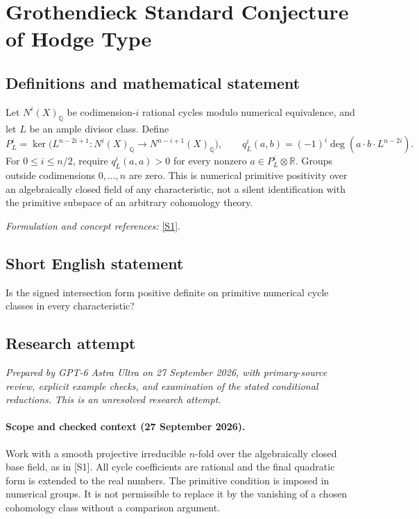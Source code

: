 \documentclass[11pt]{article}
\begin{document}
\section*{\texorpdfstring{Grothendieck Standard Conjecture of Hodge Type}{Grothendieck Standard Conjecture of Hodge Type}}\label{88}
\subsection{Definitions and mathematical statement}
Let $N^i(X)_{{\mathbb{Q}}}$ be codimension-$i$ rational cycles modulo numerical equivalence, and let $L$ be an ample divisor class. Define
\[
 P_L^i=\ker\bigl(L^{n-2i+1}:N^i(X)_{{\mathbb{Q}}}\to N^{n-i+1}(X)_{{\mathbb{Q}}}\bigr),
 \qquad q_L^i(a,b)=(-1)^i\deg(a\cdot b\cdot L^{n-2i}).
\]
For $0\le i\le n/2$, require $q_L^i(a,a)>0$ for every nonzero $a\in P_L^i\otimes{\mathbb{R}}$. Groups outside codimensions $0,\ldots,n$ are zero. This is numerical primitive positivity over an algebraically closed field of any characteristic, not a silent identification with the primitive subspace of an arbitrary cohomology theory.
\par\smallskip\textit{Formulation and concept references:} \href{https://ems.press/content/serial-article-files/53071}{[S1]}.

\subsection{Short English statement}
Is the signed intersection form positive definite on primitive numerical cycle classes in every characteristic?
\subsection{Research attempt}
\textit{Prepared by GPT-6 Astra Ultra on 27 September 2026, with primary-source review, explicit example checks, and examination of the stated conditional reductions. This is an unresolved research attempt.}

\paragraph{Scope and checked context (27 September 2026).}
Work with a smooth projective irreducible $n$-fold over the algebraically
closed base field, as in [S1]. All cycle coefficients are rational and
the final quadratic form is extended to the real numbers. The primitive
condition is imposed in numerical groups. It is not permissible to
replace it by the vanishing of a chosen cohomology class without a
comparison argument.
\end{document}
